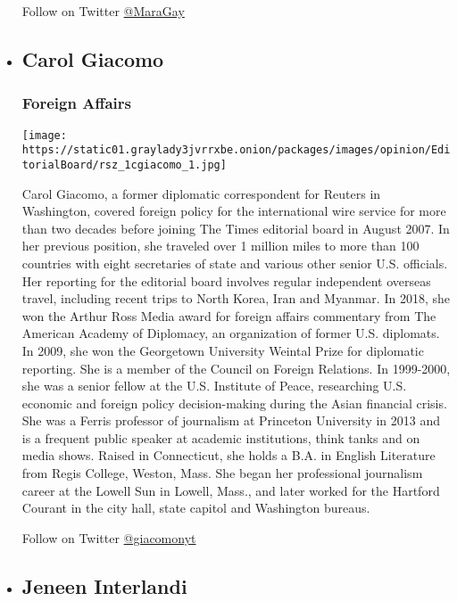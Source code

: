 \begin{itemize}
  Follow on Twitter \href{http://twitter.com/MaraGay}{@MaraGay}
\item
  \hypertarget{carol-giacomo}{%
  \subsection{Carol Giacomo}\label{carol-giacomo}}

  \hypertarget{foreign-affairs}{%
  \subsubsection{Foreign Affairs}\label{foreign-affairs}}

  \texttt{[image: https://static01.graylady3jvrrxbe.onion/packages/images/opinion/EditorialBoard/rsz\_1cgiacomo\_1.jpg]}

  Carol Giacomo, a former diplomatic correspondent for Reuters in
  Washington, covered foreign policy for the international wire service
  for more than two decades before joining The Times editorial board in
  August 2007. In her previous position, she traveled over 1 million
  miles to more than 100 countries with eight secretaries of state and
  various other senior U.S. officials. Her reporting for the editorial
  board involves regular independent overseas travel, including recent
  trips to North Korea, Iran and Myanmar. In 2018, she won the Arthur
  Ross Media award for foreign affairs commentary from The American
  Academy of Diplomacy, an organization of former U.S. diplomats. In
  2009, she won the Georgetown University Weintal Prize for diplomatic
  reporting. She is a member of the Council on Foreign Relations. In
  1999-2000, she was a senior fellow at the U.S. Institute of Peace,
  researching U.S. economic and foreign policy decision-making during
  the Asian financial crisis. She was a Ferris professor of journalism
  at Princeton University in 2013 and is a frequent public speaker at
  academic institutions, think tanks and on media shows. Raised in
  Connecticut, she holds a B.A. in English Literature from Regis
  College, Weston, Mass. She began her professional journalism career at
  the Lowell Sun in Lowell, Mass., and later worked for the Hartford
  Courant in the city hall, state capitol and Washington bureaus.

  Follow on Twitter \href{http://twitter.com/giacomonyt}{@giacomonyt}
\item
  \hypertarget{jeneen-interlandi}{%
  \subsection{Jeneen Interlandi}\label{jeneen-interlandi}}


\end{itemize}
